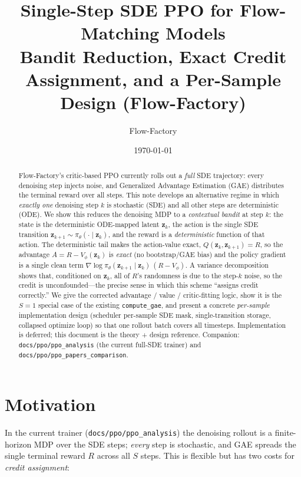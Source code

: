 \documentclass[11pt]{article}
\title{\textbf{Single-Step SDE PPO for Flow-Matching Models}\\[2pt]
\large Bandit Reduction, Exact Credit Assignment, and a Per-Sample Design (Flow-Factory)}
\author{Flow-Factory}
\date{\today}
\theoremstyle{plain}
\theoremstyle{remark}
\newcommand{\zt}{\bm{z}}
\newcommand{\Vphi}{V_\phi}
\begin{document}
\maketitle

\begin{abstract}
Flow-Factory's critic-based PPO currently rolls out a \emph{full} SDE trajectory:
every denoising step injects noise, and Generalized Advantage Estimation (GAE)
distributes the terminal reward over all steps. This note develops an alternative
regime in which \emph{exactly one} denoising step $k$ is stochastic (SDE) and all
other steps are deterministic (ODE). We show this reduces the denoising MDP to a
\emph{contextual bandit} at step $k$: the state is the deterministic ODE-mapped latent
$\zt_k$, the action is the single SDE transition $\zt_{k+1}\sim\pi_\theta(\cdot\mid
\zt_k)$, and the reward is a \emph{deterministic} function of that action. The
deterministic tail makes the action-value exact, $Q(\zt_k,\zt_{k+1})=R$, so the
advantage $A=R-\Vphi(\zt_k)$ is \emph{exact} (no bootstrap/GAE bias) and the policy
gradient is a single clean term $\nabla\!\log\pi_\theta(\zt_{k+1}\mid\zt_k)\,(R-\Vphi)$.
A variance decomposition shows that, conditioned on $\zt_k$, all of $R$'s randomness is
due to the step-$k$ noise, so the credit is unconfounded---the precise sense in which
this scheme ``assigns credit correctly.'' We give the corrected advantage / value /
critic-fitting logic, show it is the $S{=}1$ special case of the existing
\texttt{compute\_gae}, and present a concrete \emph{per-sample} implementation design
(scheduler per-sample SDE mask, single-transition storage, collapsed optimize loop) so
that one rollout batch covers all timesteps. Implementation is deferred; this document
is the theory + design reference. Companion: \texttt{docs/ppo/ppo\_analysis} (the
current full-SDE trainer) and \texttt{docs/ppo/ppo\_papers\_comparison}.
\end{abstract}

\tableofcontents

\section{Motivation}
\label{sec:motivation}

In the current trainer (\texttt{docs/ppo/ppo\_analysis}) the denoising rollout is a
finite-horizon MDP over the SDE steps; \emph{every} step is stochastic, and GAE spreads
the single terminal reward $R$ across all $S$ steps. This is flexible but has two
costs for \emph{credit assignment}:
\end{document}
